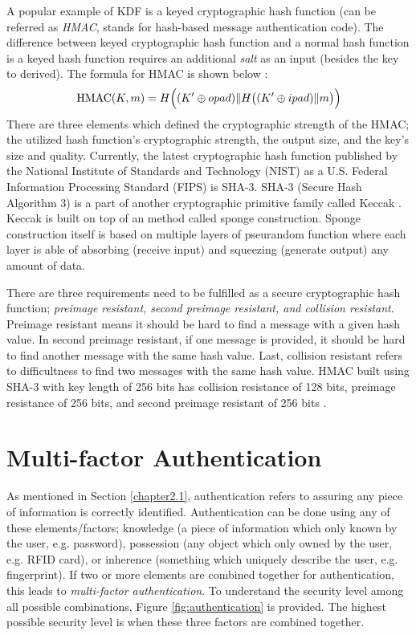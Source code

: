 A popular example of KDF is a keyed cryptographic hash function (can be referred as \textit{HMAC}, stands for hash-based message authentication code). The difference between keyed cryptographic hash function and a normal hash function is a keyed hash function requires an additional \textit{salt} as an input (besides the key to derived).
The formula for HMAC is shown below \cite{rfc2104}:
\begin{equation}
  {\displaystyle \operatorname {HMAC} (K,m)=H{\Bigl (}(K'\oplus opad)\|H{\bigl (}(K'\oplus ipad)\|m{\bigr )}{\Bigr )}}
\end{equation}
There are three elements which defined the cryptographic strength of the HMAC; the utilized hash function's cryptographic strength, the output size, and the key's size and quality. Currently, the latest cryptographic hash function published by the National Institute of Standards and Technology (NIST) as a U.S. Federal Information Processing Standard (FIPS) is SHA-3. SHA-3 (Secure Hash Algorithm 3) is a part of another cryptographic primitive family called Keccak \cite{10.1007/978-3-642-38348-9_19}. Keccak is built on top of an method called sponge construction. Sponge construction itself is based on multiple layers of pseurandom function where each layer is able of absorbing (receive input) and squeezing (generate output) any amount of data.

There are three requirements need to be fulfilled as a secure cryptographic hash function; \textit{preimage resistant, second preimage resistant, and collision resistant}. Preimage resistant means it should be hard to find a message with a given hash value. In second preimage resistant, if one message is provided, it should be hard to find another message with the same hash value.
Last, collision resistant refers to difficultness to find two messages with the same hash value. HMAC built using SHA-3 with key length of 256 bits has collision resistance of 128 bits, preimage resistance of 256 bits, and second preimage resistant of	256 bits \cite{technology2015sha}.

\section{Multi-factor Authentication}
\label{chp:2.mfa}
As mentioned in Section \ref{chapter2.1}, authentication refers to assuring any piece of information is correctly identified. Authentication can be done using any of these elements/factors; knowledge (a piece of information which only known by the user, e.g. password), possession (any object which only owned by the user, e.g. RFID card), or inherence (something which uniquely describe the user, e.g. fingerprint). If two or more elements are combined together for authentication, this leads to \textit{multi-factor authentication}. To understand the security level among all possible combinations, Figure \ref{fig:authentication} is provided. The highest possible security level is when these three factors are combined together.

